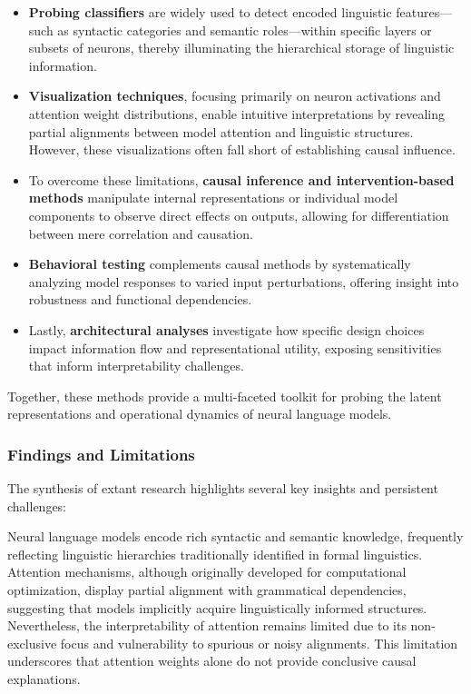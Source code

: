 \documentclass[sigconf]{acmart}
\begin{document}
\begin{itemize}
  \item \textbf{Probing classifiers} are widely used to detect encoded linguistic features—such as syntactic categories and semantic roles—within specific layers or subsets of neurons, thereby illuminating the hierarchical storage of linguistic information.
  \item \textbf{Visualization techniques}, focusing primarily on neuron activations and attention weight distributions, enable intuitive interpretations by revealing partial alignments between model attention and linguistic structures. However, these visualizations often fall short of establishing causal influence.
  \item To overcome these limitations, \textbf{causal inference and intervention-based methods} manipulate internal representations or individual model components to observe direct effects on outputs, allowing for differentiation between mere correlation and causation.
  \item \textbf{Behavioral testing} complements causal methods by systematically analyzing model responses to varied input perturbations, offering insight into robustness and functional dependencies.
  \item Lastly, \textbf{architectural analyses} investigate how specific design choices impact information flow and representational utility, exposing sensitivities that inform interpretability challenges.
\end{itemize}

Together, these methods provide a multi-faceted toolkit for probing the latent representations and operational dynamics of neural language models.

\subsubsection{Findings and Limitations}

The synthesis of extant research highlights several key insights and persistent challenges:

Neural language models encode rich syntactic and semantic knowledge, frequently reflecting linguistic hierarchies traditionally identified in formal linguistics. Attention mechanisms, although originally developed for computational optimization, display partial alignment with grammatical dependencies, suggesting that models implicitly acquire linguistically informed structures. Nevertheless, the interpretability of attention remains limited due to its non-exclusive focus and vulnerability to spurious or noisy alignments. This limitation underscores that attention weights alone do not provide conclusive causal explanations.
\end{document}
